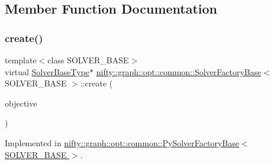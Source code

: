 \subsection{Member Function Documentation}
\mbox{\label{classnifty_1_1graph_1_1opt_1_1common_1_1SolverFactoryBase_a590dfdc8643a663d8c8adca6164de8f7}} 
\subsubsection{\texorpdfstring{create()}{create()}}
{\footnotesize\ttfamily template$<$class S\+O\+L\+V\+E\+R\+\_\+\+B\+A\+SE$>$ \\
virtual \hyperlink{classnifty_1_1graph_1_1opt_1_1common_1_1SolverFactoryBase_a83f347591f4cffa7afb13c8f495dcce2}{Solver\+Base\+Type}$\ast$ \hyperlink{classnifty_1_1graph_1_1opt_1_1common_1_1SolverFactoryBase}{nifty\+::graph\+::opt\+::common\+::\+Solver\+Factory\+Base}$<$ S\+O\+L\+V\+E\+R\+\_\+\+B\+A\+SE $>$\+::create (\begin{DoxyParamCaption}\item[{const \hyperlink{classnifty_1_1graph_1_1opt_1_1common_1_1SolverFactoryBase_ab71d93640cf3fbc0bc980450d5db6e45}{Objective\+Type} \&}]{objective }\end{DoxyParamCaption})\hspace{0.3cm}{\ttfamily [pure virtual]}}



Implemented in \hyperlink{classnifty_1_1graph_1_1opt_1_1common_1_1PySolverFactoryBase_a4d2362161eba8c351f771687f8bbbe87}{nifty\+::graph\+::opt\+::common\+::\+Py\+Solver\+Factory\+Base$<$ S\+O\+L\+V\+E\+R\+\_\+\+B\+A\+S\+E $>$}.

\mbox{\label{classnifty_1_1graph_1_1opt_1_1common_1_1SolverFactoryBase_a95a2e4e53959b7fb168d8ab707b3d4a7}} 
